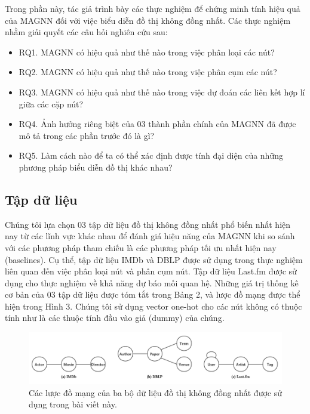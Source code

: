 Trong phần này, tác giả trình bày các thực nghiệm để chứng minh tính hiệu quả của MAGNN đối với việc biểu diễn đồ thị không đồng nhất. Các thực nghiệm nhằm giải quyết các câu hỏi nghiên cứu sau:

\begin{itemize}
  \item RQ1. MAGNN có hiệu quả như thế nào trong việc phân loại các nút?
  \item RQ2. MAGNN có hiệu quả như thế nào trong việc phân cụm các nút?
  \item RQ3. MAGNN có hiệu quả như thế nào trong việc dự đoán các liên kết hợp lí giữa các cặp nút?
  \item RQ4. Ảnh hưởng riêng biệt của 03 thành phần chính của MAGNN đã được mô tả trong các phần trước đó là gì?
  \item RQ5. Làm cách nào để ta có thể xác định được tính đại diện của những phương pháp biểu diễn đồ thị khác nhau?
\end{itemize}

\subsection{Tập dữ liệu}
Chúng tôi lựa chọn 03 tập dữ liệu đồ thị không đồng nhất phổ biến nhất hiện nay từ các lĩnh vực khác nhau để đánh giá hiệu năng của MAGNN khi so sánh với các phương pháp tham chiếu là các phương pháp tối ưu nhất hiện nay (baselines). Cụ thể, tập dữ liệu IMDb và DBLP được sử dụng trong thực nghiệm liên quan đến việc phân loại nút và phân cụm nút. Tập dữ liệu Last.fm được sử dụng cho thực nghiệm về khả năng dự báo mối quan hệ. Những giá trị thống kê cơ bản của 03 tập dữ liệu được tóm tắt trong Bảng 2, và lược đồ mạng được thể hiện trong Hình 3. Chúng tôi sử dụng vector one-hot cho các nút không có thuộc tính như là các thuộc tính đầu vào giả (dummy) của chúng. 

\begin{figure}
  \includegraphics[width=\textwidth]{figs/fig3.png}
  \caption{Các lược đồ mạng của ba bộ dữ liệu đồ thị không đồng nhất được sử dụng trong bài viết này.}
\end{figure}

